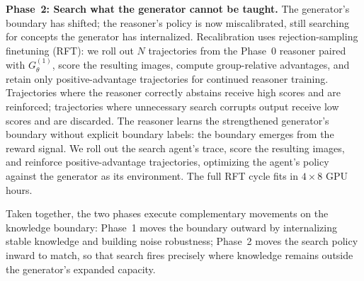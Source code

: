 \documentclass{article}
\begin{document}
\textbf{Phase~2: Search what the generator cannot be taught.}
The generator's boundary has shifted; the reasoner's policy is now miscalibrated, still searching for concepts the generator has internalized.
Recalibration uses rejection-sampling finetuning (RFT): we roll out $N$ trajectories from the Phase~0 reasoner paired with $G_\theta^{(1)}$, score the resulting images, compute group-relative advantages, and retain only positive-advantage trajectories for continued reasoner training.
Trajectories where the reasoner correctly abstains receive high scores and are reinforced; trajectories where unnecessary search corrupts output receive low scores and are discarded.
The reasoner learns the strengthened generator's boundary without explicit boundary labels: the boundary emerges from the reward signal. {We roll out the search agent's trace, score the resulting images, and reinforce positive-advantage trajectories, optimizing the agent's policy against the generator as its environment.}
The full RFT cycle fits in $4 \times 8$ GPU hours.

Taken together, the two phases execute complementary movements on the knowledge boundary: Phase~1 moves the boundary outward by internalizing stable knowledge and building noise robustness; Phase~2 moves the search policy inward to match, so that search fires precisely where knowledge remains outside the generator's expanded capacity.


\end{document}
